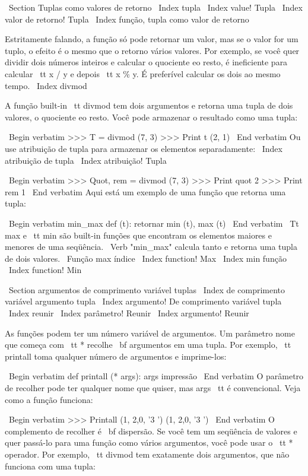 \documentclass[10pt]{book}
\begin{document}
\begin {itemize}
{{{{{{{{\ Section {Tuplas como valores de retorno}
\ Index {} tupla
\ Index {value! Tupla}
\ Index {valor de retorno! Tupla}
\ Index {função, tupla como valor de retorno}

Estritamente falando, a função só pode retornar um valor, mas
se o valor for um tuplo, o efeito é o mesmo que o retorno
vários valores. Por exemplo, se você quer dividir dois números inteiros
e calcular o quociente eo resto, é ineficiente para
calcular {\ tt x / y} e depois {\ tt x \% y}. É preferível calcular
os dois ao mesmo tempo.
\ Index {} divmod

A função built-in {\ tt divmod} tem dois argumentos e
retorna uma tupla de dois valores, o quociente eo resto.
Você pode armazenar o resultado como uma tupla:

\ Begin {verbatim}
>>> T = divmod (7, 3)
>>> Print t
(2, 1)
\ End {verbatim}
%
Ou use atribuição de tupla para armazenar os elementos separadamente:
\ Index {atribuição de tupla}
\ Index {atribuição! Tupla}

\ Begin {verbatim}
>>> Quot, rem = divmod (7, 3)
>>> Print quot
2
>>> Print rem
1
\ End {verbatim}
%
Aqui está um exemplo de uma função que retorna uma tupla:

\ Begin {verbatim}
min_max def (t):
    retornar min (t), max (t)
\ End {verbatim}
%
{\ Tt max} e {\ tt min} são built-in funções que encontram
os elementos maiores e menores de uma seqüência. \ Verb "min_max"
calcula tanto e retorna uma tupla de dois valores.
\ {Função max} índice
\ Index {function! Max}
\ Index {min função}
\ Index {function! Min}


\ Section {argumentos de comprimento variável tuplas}
\ Index {de comprimento variável argumento tupla}
\ Index {argumento! De comprimento variável tupla}
\ Index {reunir}
\ Index {parâmetro! Reunir}
\ Index {argumento! Reunir}

As funções podem ter um número variável de argumentos. Um parâmetro
nome que começa com {\ tt *} {recolhe \ bf} argumentos em
uma tupla. Por exemplo, {\ tt printall}
toma qualquer número de argumentos e imprime-los:

\ Begin {verbatim}
def printall (* args):
    args impressão
\ End {verbatim}
%
O parâmetro de recolher pode ter qualquer nome que quiser, mas {args \ tt} é
convencional. Veja como a função funciona:

\ Begin {verbatim}
>>> Printall (1, 2,0, '3 ')
(1, 2,0, '3 ')
\ End {verbatim}
%
O complemento de recolher é {\ bf dispersão}. Se você tem um
seqüência de valores e quer passá-lo para uma função
como vários argumentos, você pode usar o {\ tt *} operador.
Por exemplo, {\ tt divmod} tem exatamente dois argumentos, que
não funciona com uma tupla:

}}}}}}}}
\end{itemize}
\end{document}
